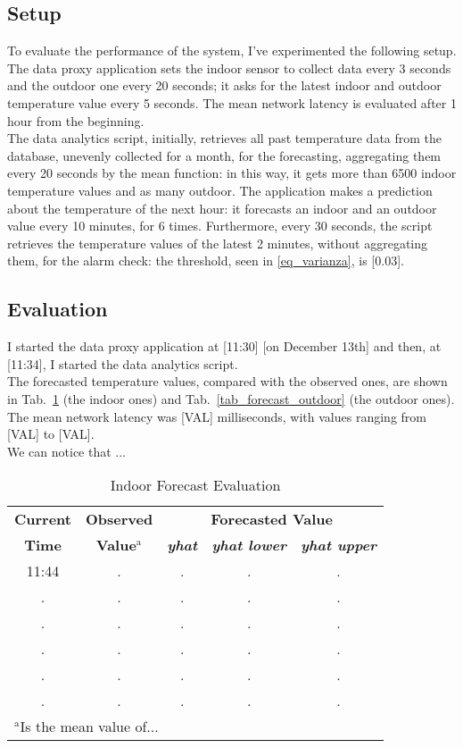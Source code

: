 \documentclass[conference]{IEEEtran}
\begin{document}
\subsection{Setup}
To evaluate the performance of the system, I've experimented the following setup.\\
The data proxy application sets the indoor sensor to collect data every 3 seconds and the outdoor one every 20 seconds; it asks for the latest indoor and outdoor temperature value every 5 seconds. The mean network latency is evaluated after 1 hour from the beginning.\\
The data analytics script, initially, retrieves all past temperature data from the database, unevenly collected for a month, for the forecasting, aggregating them every 20 seconds by the mean function: in this way, it gets more than 6500 indoor temperature values and as many outdoor. The application makes a prediction about the temperature of the next hour: it forecasts an indoor and an outdoor value every 10 minutes, for 6 times. Furthermore, every 30 seconds, the script retrieves the temperature values of the latest 2 minutes, without aggregating them, for the alarm check: the threshold, seen in \eqref{eq_varianza}, is [$0.03$].

\subsection{Evaluation}
I started the data proxy application at [11:30] [on December 13th] and then, at [11:34], I started the data analytics script.\\
The forecasted temperature values, compared with the observed ones, are shown in Tab.~\ref{tab_forecast_indoor} (the indoor ones) and Tab.~\ref{tab_forecast_outdoor} (the outdoor ones). The mean network latency was [VAL] milliseconds, with values ranging from [VAL] to [VAL].\\
We can notice that
...

\begin{table}[htbp]
\caption{Indoor Forecast Evaluation}
\begin{center}
\begin{tabular}{|c|c|c|c|c|}
\hline
\textbf{Current} & \textbf{Observed} & \multicolumn{3}{|c|}{\textbf{Forecasted Value}} \\
\cline{3-5}
\textbf{Time} & \textbf{Value}$^{\mathrm{a}}$ & \textbf{\textit{yhat}} & \textbf{\textit{yhat lower}} & \textbf{\textit{yhat upper}} \\
\hline
11:44 & . & . & . & . \\
\hline
. & . & . & . & . \\
\hline
. & . & . & . & . \\
\hline
. & . & . & . & . \\
\hline
. & . & . & . & . \\
\hline
. & . & . & . & . \\
\hline
\multicolumn{4}{l}{$^{\mathrm{a}}$Is the mean value of...}
\end{tabular}
\label{tab_forecast_indoor}
\end{center}
\end{table}
\end{document}
